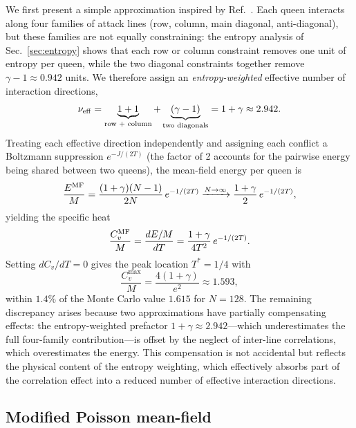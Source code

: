 \documentclass[aps, pre, reprint, amsmath, amssymb, superscriptaddress, floatfix]{revtex4-2}
\begin{document}
We first present a simple approximation inspired by
Ref.~\cite{Polson2024}.  Each queen interacts along four families of
attack lines (row, column, main diagonal, anti-diagonal), but these
families are not equally constraining: the entropy analysis of
Sec.~\ref{sec:entropy} shows that each row or column constraint
removes one unit of entropy per queen, while the two diagonal
constraints together remove $\gamma - 1 \approx 0.942$ units.
We therefore assign an \emph{entropy-weighted} effective number
of interaction directions,
\begin{equation}
  \nu_{\rm eff} = \underbrace{1 + 1}_{\text{row + column}}
  + \underbrace{(\gamma - 1)}_{\text{two diagonals}} = 1 + \gamma
  \approx 2.942.
  \label{eq:nu_eff}
\end{equation}
Treating each effective direction independently and assigning each
conflict a Boltzmann suppression
$e^{-J/(2T)}$ (the factor of 2 accounts for the pairwise energy being
shared between two queens), the mean-field energy per queen is
\begin{equation}
  \frac{E^{\rm MF}}{M}
  = \frac{(1+\gamma)(N-1)}{2N}\,e^{-1/(2T)}
  \xrightarrow{N \to \infty}
  \frac{1+\gamma}{2}\,e^{-1/(2T)},
  \label{eq:E_simple}
\end{equation}
yielding the specific heat
\begin{equation}
  \frac{C_v^{\rm MF}}{M} = \frac{dE/M}{dT}
  = \frac{1+\gamma}{4T^2}\,e^{-1/(2T)}.
  \label{eq:Cv_simple}
\end{equation}
Setting $dC_v/dT = 0$ gives the peak location $T^* = 1/4$ with
\begin{equation}
  \frac{C_v^{\max}}{M} = \frac{4(1+\gamma)}{e^2} \approx 1.593,
  \label{eq:Cv_peak_simple}
\end{equation}
within $1.4\%$ of the Monte Carlo value $1.615$ for $N = 128$.
The remaining discrepancy arises because two approximations
have partially compensating effects: the entropy-weighted
prefactor $1+\gamma \approx 2.942$---which underestimates the
full four-family contribution---is offset by the neglect of
inter-line correlations, which overestimates the energy.
This compensation is not accidental but reflects the
physical content of the entropy weighting, which effectively
absorbs part of the correlation effect into a reduced number
of effective interaction directions.

\subsection{Modified Poisson mean-field}
\end{document}
